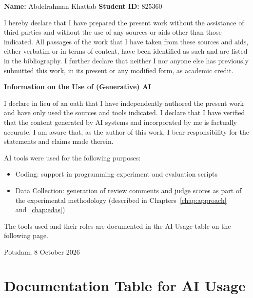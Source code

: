 \noindent
\textbf{Name:} Abdelrahman Khattab \hfill \textbf{Student ID:} 825360

\bigskip
\noindent
I hereby declare that I have prepared the present work without the assistance
of third parties and without the use of any sources or aids other than those
indicated. All passages of the work that I have taken from these sources and
aids, either verbatim or in terms of content, have been identified as such and
are listed in the bibliography. I further declare that neither I nor anyone
else has previously submitted this work, in its present or any modified form,
as academic credit.

\bigskip
\textbf{Information on the Use of (Generative) AI}

\medskip
\noindent
I declare in lieu of an oath that I have independently authored the present
work and have only used the sources and tools indicated. I declare that I have
verified that the content generated by AI systems and incorporated by me is
factually accurate. I am aware that, as the author of this work, I bear
responsibility for the statements and claims made therein.

\medskip
\noindent
AI tools were used for the following purposes:
\begin{itemize}[nosep]
    \item[\checkmark] Coding: support in programming experiment and evaluation scripts
    \item[\checkmark] Data Collection: generation of review comments and judge
          scores as part of the experimental methodology
          (described in Chapters~\ref{chap:approach} and~\ref{chap:edas})
\end{itemize}

\noindent
The tools used and their roles are documented in the AI Usage table on the
following page.

\vspace{6ex}
\begin{flushleft}
    Potsdam, 8 October 2026
    \hspace*{2em}
\end{flushleft}

\clearpage

\section*{Documentation Table for AI Usage}

